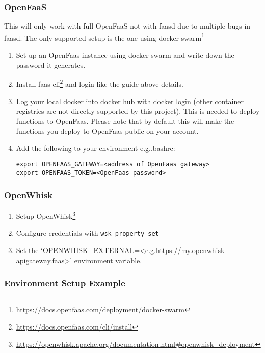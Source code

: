 \documentclass[../main.tex]{subfiles}
\begin{document}
\subsubsection{OpenFaaS}\label{sec:providersetupopenfaas}
This will only work with full OpenFaaS not with faasd due to multiple bugs in faasd.
The only supported setup is the one using docker-swarm\footnote{\url{https://docs.openfaas.com/deployment/docker-swarm}}
\begin{enumerate}
\item Set up an OpenFaas instance using docker-swarm and write down the password it generates.
\item Install faas-cli\footnote{\url{https://docs.openfaas.com/cli/install}} and login like the guide above details.
\item Log your local docker into docker hub with docker login (other container registries are not directly supported by this project).
This is needed to deploy functions to OpenFaas. Please note that by default this will make the functions you deploy to OpenFaas public on your account.
\item Add the following to your environment e.g.\@ .bashrc: 
  \begin{tcolorbox}
    \texttt{export OPENFAAS\_GATEWAY=<address of OpenFaas gateway>}\\
    \texttt{export OPENFAAS\_TOKEN=<OpenFaas password>}\\
  \end{tcolorbox}
\end{enumerate}

\subsubsection{OpenWhisk}\label{sec:providersetupopenwhisk}

\begin{enumerate}
\item Setup OpenWhisk\footnote{\url{https://openwhisk.apache.org/documentation.html\#openwhisk\_deployment}}
\item Configure credentials with \texttt{wsk property set}
\item Set the `OPENWHISK\_EXTERNAL=<e.g.\@ https://my.openwhisk-apigateway.faas>' environment variable.
\end{enumerate}

\subsubsection{Environment Setup Example}\label{sec:providersetupenv}
\end{document}
